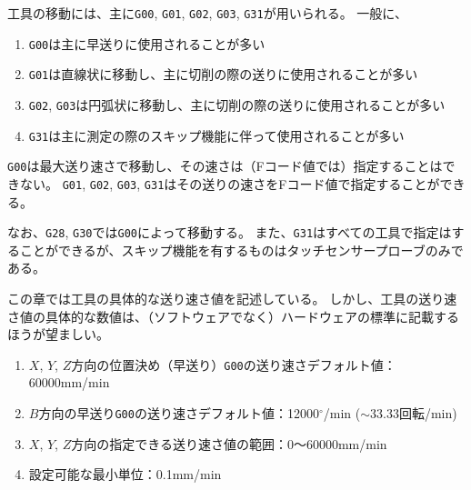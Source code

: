 


工具の移動には、主に\verb|G00|, \verb|G01|, \verb|G02|, \verb|G03|, \verb|G31|が用いられる。
一般に、
\begin{enumerate}
\item \verb|G00|は主に早送りに使用されることが多い
\item \verb|G01|は直線状に移動し、主に切削の際の送りに使用されることが多い
\item \verb|G02|, \verb|G03|は円弧状に移動し、主に切削の際の送りに使用されることが多い
\item \verb|G31|は主に測定の際のスキップ機能に伴って使用されることが多い
\end{enumerate}
\verb|G00|は最大送り速さで移動し、その速さは（Fコード値では）指定することはできない。
\verb|G01|, \verb|G02|, \verb|G03|, \verb|G31|はその送りの速さをFコード値で指定することができる。

なお、\verb|G28|, \verb|G30|では\verb|G00|によって移動する。
また、\verb|G31|はすべての工具で指定はすることができるが、スキップ機能を有するものはタッチセンサープローブのみである。
\begin{hosoku}
この章では工具の具体的な送り速さ値を記述している。
しかし、工具の送り速さ値の具体的な数値は、（ソフトウェアでなく）ハードウェアの標準に記載するほうが望ましい。
\end{hosoku}



\begin{enumerate}
\item $X$, $Y$, $Z$方向の位置決め（早送り）\verb|G00|の送り速さデフォルト値：60000mm/min
\item $B$方向の早送り\verb|G00|の送り速さデフォルト値：12000$^\circ$/min ($\sim 33.33$回転/min)
\item $X$, $Y$, $Z$方向の指定できる送り速さ値の範囲：0～60000mm/min
\item 設定可能な最小単位：0.1mm/min
\end{enumerate}



